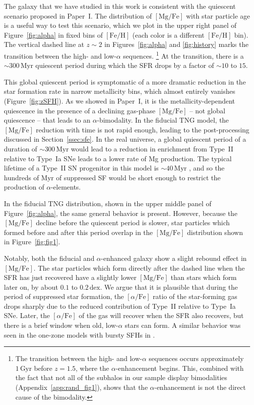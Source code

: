 \documentclass[twocolumn]{aastex631}
\newcommand{\Gyr}{\ensuremath{\textrm{Gyr}}}
\newcommand{\Myr}{\ensuremath{\textrm{Myr}}}
\newcommand{\FeH}{\ensuremath{[\textrm{Fe}/\textrm{H}]}}
\newcommand{\MgFe}{\ensuremath{[\textrm{Mg}/\textrm{Fe}]}}
\newcommand{\alphaFe}{\ensuremath{[\alpha/\textrm{Fe}]}}
\newcommand{\dex}{\ensuremath{\textrm{dex}}}
\begin{document}
The galaxy that we have studied in this work is consistent with the quiescent scenario proposed in Paper~I. The distribution of \MgFe{} with star particle age is a useful way to test this scenario, which we plot in the upper right panel of Figure~\ref{fig:alpha} in fixed bins of \FeH{} (each color is a different \FeH{} bin). The vertical dashed line at $z\sim2$ in Figures~\ref{fig:alpha} and \ref{fig:history} marks the transition between the high- and low-$\alpha$ sequences.
\footnote{The transition between the high- and low-$\alpha$ sequences occurs approximately $1\,\Gyr$ before $z=1.5$, where the $\alpha$-enhancement begins. This, combined with the fact that not all of the subhalos in our sample display bimodalities (Appendix~\ref{app:rand_fig1}), shows that the $\alpha$-enhancement is not the direct cause of the bimodality.} At the transition, there is a $\sim300\,\Myr$ quiescent period during which the SFR drops by a factor of $\sim10$ to $15$.

This global quiescent period is symptomatic of a more dramatic reduction in the star formation rate in narrow metallicity bins, which almost entirely vanishes (Figure~\ref{fig:zSFH}). As we showed in Paper~I, it is the metallicity-dependent quiescence in the presence of a declining gas-phase \MgFe{} -- not global quiescence -- that leads to an $\alpha$-bimodality. In the fiducial TNG model, the \MgFe{} reduction with time is not rapid enough, leading to the post-processing discussed in Section~\ref{ssec:sfe}. In the real universe, a global quiescent period of a duration of $\sim300\,\Myr$ would lead to a reduction in enrichment from Type~II relative to Type~Ia SNe leads to a lower rate of Mg production. The typical lifetime of a Type~II SN progenitor in this model is $\sim40\,\Myr$ \citep{2018MNRAS.473.4077P}, and so the hundreds of Myr of suppressed SF would be short enough to restrict the production of $\alpha$-elements.

In the fiducial TNG distribution, shown in the upper middle panel of Figure~\ref{fig:alpha}, the same general behavior is present. However, because the \MgFe{} decline before the quiescent period is slower, star particles which formed before and after this period overlap in the \MgFe{} distribution shown in Figure~\ref{fig:fig1}.

Notably, both the fiducial and $\alpha$-enhanced galaxy show a slight rebound effect in \MgFe{}. The star particles which form directly after the dashed line when the SFR has just recovered have a slightly lower \MgFe{} than stars which form later on, by about $0.1$ to $0.2\,\dex$. We argue that it is plausible that during the period of suppressed star formation, the \alphaFe{} ratio of the star-forming gas drops sharply due to the reduced contribution of Type~II relative to Type~Ia SNe. Later, the \alphaFe{} of the gas will recover when the SFR also recovers, but there is a brief window when old, low-$\alpha$ stars can form. A similar behavior was seen in the one-zone models with bursty SFHs in \citet{2020MNRAS.498.1364J}.
\end{document}
